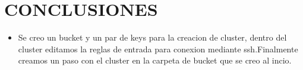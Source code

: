 \documentclass[12pt,letterpaper]{article}
\begin{document}
		
	\section{CONCLUSIONES}
	\begin{itemize}
			\item Se creo un bucket y un par de keys para la creacion de cluster, dentro del cluster editamos la reglas de entrada para conexion mediante ssh.Finalmente creamos un paso con el cluster en la carpeta de bucket que se creo al incio.
			\end{itemize}
		
		
	
\end{document}
